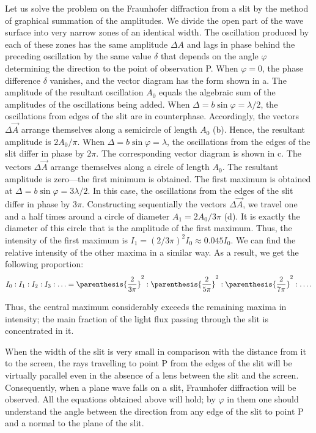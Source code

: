 Let us solve the problem on the Fraunhofer diffraction from a slit by the method of graphical summation of the amplitudes.
We divide the open part of the wave surface into very narrow zones of an identical width.
The oscillation produced by each of these zones has the same amplitude $\Delta{A}$ and lags in phase behind the preceding oscillation by the same value $\delta$ that depends on the angle $\varphi$ determining the direction to the point of observation P.
When $\varphi=0$, the phase difference $\delta$ vanishes, and the vector diagram has the form shown in a.
The amplitude of the resultant oscillation $A_0$ equals the algebraic sum of the amplitudes of the oscillations being added.
When $\Delta=b\sin\varphi=\lambda/2$, the oscillations from edges of the slit are in counterphase.
Accordingly, the vectors $\Delta{\vec{A}}$ arrange themselves along a semicircle of length $A_0$ (b).
Hence, the resultant amplitude is $2A_0/\pi$.
When $\Delta=b\sin\varphi=\lambda$, the oscillations from the edges of the slit differ in phase by $2\pi$.
The corresponding vector diagram is shown in c.
The vectors $\Delta{\vec{A}}$ arrange themselves along a circle of length $A_0$.
The resultant amplitude is zero---the first minimum is obtained.
The first maximum is obtained at $\Delta=b\sin\varphi=3\lambda/2$.
In this case, the oscillations from the edges
of the slit differ in phase by $3\pi$.
Constructing sequentially the vectors $\Delta{\vec{A}}$, we travel one and a half times around a circle of diameter $A_1=2A_0/3\pi$ (d).
It is exactly the diameter of this circle that is the amplitude of the first maximum.
Thus, the intensity of the first maximum is $I_1= (2/3\pi)^2I_0\approx 0.045 I_0$.
We can find the relative intensity of the other maxima in a similar way.
As a result, we get the following proportion:
\begin{equation}\label{eq:18_30}
	I_0 : I_1 : I_2 : I_3 : \ldots = \parenthesis{\frac{2}{3\pi}}^2 : \parenthesis{\frac{2}{5\pi}}^2 : \parenthesis{\frac{2}{7\pi}}^2 : \ldots.
\end{equation}

\noindent
Thus, the central maximum considerably exceeds the remaining maxima in intensity; the main fraction of the light flux passing through the slit is concentrated in it.

When the width of the slit is very small in comparison with the distance from it to the screen, the rays travelling to point P from the edges of the slit will be virtually parallel even in the absence of a lens between the slit and the screen.
Consequently, when a plane wave falls on a slit, Fraunhofer diffraction will be observed.
All the equations obtained above will hold; by $\varphi$ in them one should understand the angle between the direction from any edge of the slit to point P and a normal to the plane of the slit.

